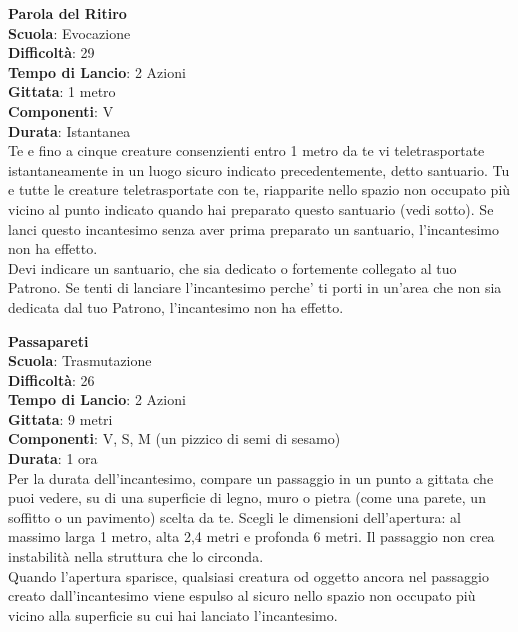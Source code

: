 \begin{multicols}{2}
\medskip\textbf{Parola del Ritiro}\\
\textbf{Scuola}: Evocazione\\
\textbf{Difficoltà}: 29\\
\textbf{Tempo di Lancio}: 2 Azioni\\
\textbf{Gittata}: 1 metro\\
\textbf{Componenti}: V\\
\textbf{Durata}: Istantanea\\
Te e fino a cinque creature consenzienti entro 1 metro da te vi teletrasportate istantaneamente in un luogo sicuro indicato precedentemente, detto santuario. Tu e tutte le creature teletrasportate con te, riapparite nello spazio non occupato più vicino al punto indicato quando hai preparato questo santuario (vedi sotto). Se lanci questo incantesimo senza aver prima preparato un santuario, l'incantesimo non ha effetto.\\
Devi indicare un santuario, che sia dedicato o fortemente collegato al tuo Patrono. Se tenti di lanciare l'incantesimo perche' ti porti in un'area che non sia dedicata dal tuo Patrono, l'incantesimo non ha effetto.

\medskip\textbf{Passapareti}\\
\textbf{Scuola}: Trasmutazione\\
\textbf{Difficoltà}: 26\\
\textbf{Tempo di Lancio}: 2 Azioni\\
\textbf{Gittata}: 9 metri\\
\textbf{Componenti}: V, S, M (un pizzico di semi di sesamo)\\
\textbf{Durata}: 1 ora\\
Per la durata dell'incantesimo, compare un passaggio in un punto a gittata che puoi vedere, su di una superficie di legno, muro o pietra (come una parete, un soffitto o un pavimento) scelta da te. Scegli le dimensioni dell'apertura: al massimo larga 1 metro, alta 2,4 metri e profonda 6 metri. Il passaggio non crea instabilità nella struttura che lo circonda.\\
Quando l'apertura sparisce, qualsiasi creatura od oggetto ancora nel passaggio creato dall'incantesimo viene espulso al sicuro nello spazio non occupato più vicino alla superficie su cui hai lanciato l'incantesimo.


\end{multicols}
